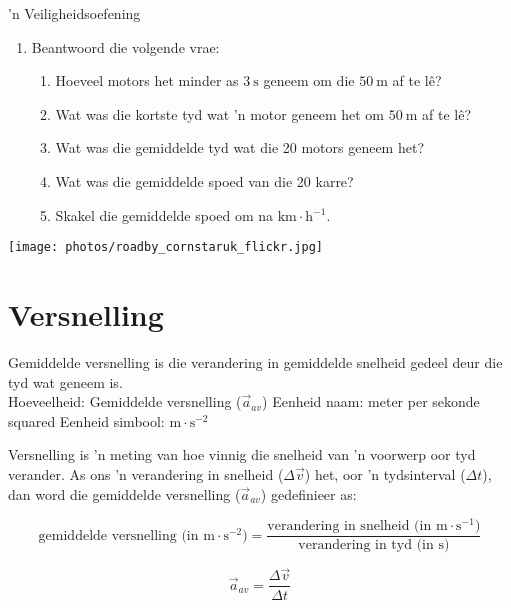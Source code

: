 \begin{Investigation}{ 'n Veiligheidsoefening}
\begin{enumerate}[noitemsep, label=\textbf{\arabic*}. ]
\item Beantwoord die volgende vrae:
\begin{enumerate}[noitemsep, label=\textbf{\alph*}. ] 
    \item Hoeveel motors het minder as $3~\text{s}$ geneem om die $50~\text{m}$ af te l\^e?
    \item Wat was die kortste tyd wat 'n motor geneem het om $50~\text{m}$ af te l\^e?
    \item Wat was die gemiddelde tyd wat die 20 motors geneem het?
    \item Wat was die gemiddelde spoed van die 20 karre?
    \item Skakel die gemiddelde spoed om na $\text{km}\ensuremath{\cdot}\text{h}{}^{-1}$.
\end{enumerate}
        \end{enumerate}
\begin{center}
\texttt{[image: photos/roadby\_cornstaruk\_flickr.jpg]}
\end{center}
\end{Investigation}



\section{Versnelling}
 {Gemiddelde versnelling is die verandering in gemiddelde snelheid gedeel deur die tyd wat geneem is.\\
Hoeveelheid: Gemiddelde versnelling ($\vec{a}_{av}$) \hspace{.5cm} Eenheid naam: meter per sekonde squared \hspace{.5cm} Eenheid simbool:  $\text{m} \cdot \text{s}^{-2}$ } 

Versnelling is 'n meting van hoe vinnig  die snelheid van 'n voorwerp oor tyd verander. As ons 'n verandering in snelheid ($\Delta \vec{v}$) het, oor 'n tydsinterval ($\Delta t$), dan word die gemiddelde versnelling ($\vec{a}_{av}$) gedefinieer as:

\begin{equation*}
    \text{gemiddelde versnelling (in m} \cdot {\text{s}}^{-2}\text{)} =\frac{\text{verandering in snelheid (in m} \cdot {\text{s}}^{-1}\text{)}}{\text{verandering in tyd (in s)}}
      \end{equation*}
        
    \begin{equation*}
    \vec{a}_{av}=\frac{\Delta \vec{v}}{\Delta t}
      \end{equation*}

